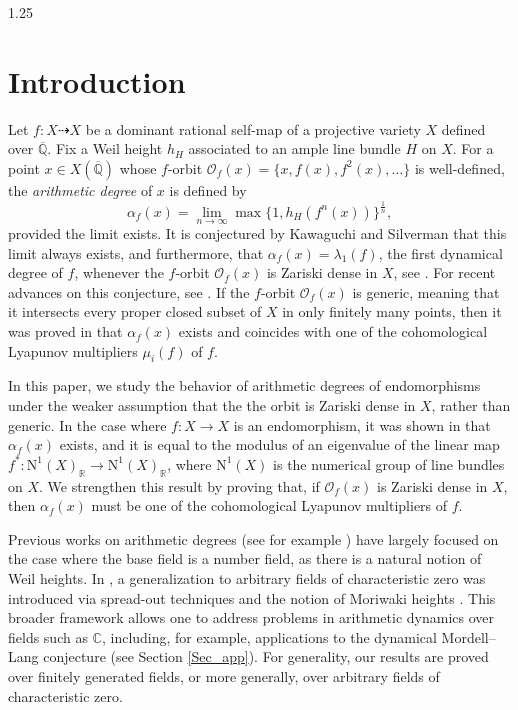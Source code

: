 \documentclass[12pt]{amsart}
\newcommand\mO{\mathcal{O}}
\newcommand{\mb}[1]{\mathbb{#1}}
\newcommand{\ov}{\overline}
\newcommand\ra{\rightarrow}
\begin{document}
\begin{spacing}{1.25}
\section{Introduction}\label{Sec_intro}

Let $f:X\dashrightarrow X$ be a dominant rational self-map of a projective variety $X$ defined over $\overline{\mb{Q}}$. Fix a Weil height $h_H$ associated to an ample line bundle $H$ on $X$. For a point $x\in X(\ov{\mb{Q}})$ whose $f$-orbit $\mO_f(x)=\{x,f(x),f^2(x),\ldots\}$ is well-defined, the \emph{arithmetic degree} of $x$ is defined by 
\[\alpha_f(x)=\lim_{n\ra\infty}\max\{1, h_H(f^n(x))\}^{\frac{1}{n}},\]
provided the limit exists. It is conjectured by Kawaguchi and Silverman that this limit always exists, and furthermore, that $\alpha_f(x)=\lambda_1(f)$, the first dynamical degree of $f$, whenever the $f$-orbit $\mO_f(x)$ is Zariski dense in $X$, see \cite{KS16C}. For recent advances on this conjecture, see \cite{Mat22}. If the $f$-orbit $\mO_f(x)$ is generic, meaning that it intersects every proper closed subset of $X$ in only finitely many points, then it was proved in \cite[Theorem 2.2]{Mat25} that $\alpha_f(x)$ exists and coincides with one of the cohomological Lyapunov multipliers $\mu_i(f)$ of $f$.

In this paper, we study the behavior of arithmetic degrees of endomorphisms under the weaker assumption that the the orbit is Zariski dense in $X$, rather than generic. In the case where $f: X\ra X$ is an endomorphism, it was shown in \cite{KS16} that $\alpha_f(x)$ exists, and it is equal to the modulus of an eigenvalue of the linear map $f^*:\mathrm{N}^1(X)_{\mathbb{R}}\rightarrow\mathrm{N}^1(X)_{\mathbb{R}}$, where $\mathrm{N}^1(X)$ is the numerical group of line bundles on $X$. We strengthen this result by proving that, if $\mO_f(x)$ is Zariski dense in $X$, then $\alpha_f(x)$ must be one of the cohomological Lyapunov multipliers of $f$.

Previous works on arithmetic degrees (see for example \cite{KS16,KS16C,Mat20}) have largely focused on the case where the base field is a number field, as there is a natural notion of Weil heights. In \cite{LS24}, a generalization to arbitrary fields of characteristic zero was introduced via spread-out techniques and the notion of Moriwaki heights \cite{Mor00}. This broader framework allows one to address problems in arithmetic dynamics over fields such as $\mathbb{C}$, including, for example, applications to the dynamical Mordell–Lang conjecture (see Section \ref{Sec_app}). For generality, our results are proved over finitely generated fields, or more generally, over arbitrary fields of characteristic zero.


\end{spacing}
\end{document}
